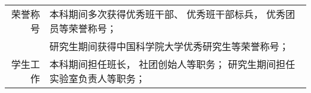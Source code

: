 %
%




\begin{tabular}{rl}
	荣誉称号 & 本科期间多次获得优秀班干部、 优秀班干部标兵， 优秀团员等荣誉称号；\\
	        & 研究生期间获得中国科学院大学优秀研究生等荣誉称号；\\
	学生工作 & 本科期间担任班长， 社团创始人等职务； 研究生期间担任实验室负责人等职务； \\
\end{tabular}
